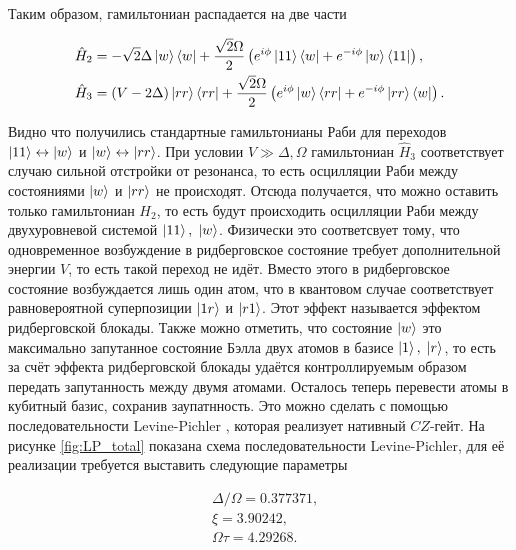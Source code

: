 Таким образом, гамильтониан распадается на две части

\begin{equation}
	\begin{aligned}
		& \hat{H}_{2} = -\sqrt{2}\Delta \left| w \right\rangle\left\langle w \right| + \frac{\sqrt{2}\Omega}{2}\left(e^{i\phi}\left| 11 \right\rangle\left\langle w \right| +e^{-i\phi}\left| w \right\rangle\left\langle 11 \right| \right), \\
		& \hat{H}_{3} = (V-2\Delta)\left| rr \right\rangle\left\langle rr \right| + \frac{\sqrt{2}\Omega}{2}\left(e^{i\phi}\left| w \right\rangle\left\langle rr \right| +e^{-i\phi}\left| rr \right\rangle\left\langle w \right| \right).
	\end{aligned}
\end{equation}

Видно что получились стандартные гамильтонианы Раби для переходов $\left| 11 \right\rangle \leftrightarrow \left| w \right\rangle$ и $\left| w \right\rangle \leftrightarrow \left| rr \right\rangle$. При условии $V \gg \Delta, \Omega$ гамильтониан $\hat{H}_3$ соответствует случаю сильной отстройки от резонанса, то есть осцилляции Раби между состояниями $\left| w \right\rangle$ и $\left| rr \right\rangle$ не происходят. Отсюда получается, что можно оставить только гамильтониан $H_2$, то есть будут происходить осцилляции Раби между двухуровневой системой $\left| 11 \right\rangle, \; \left| w \right\rangle$. Физически это соответсвует тому, что одновременное возбуждение в ридберговское состояние требует дополнительной энергии $V$, то есть такой переход не идёт. Вместо этого в ридберговское состояние возбуждается лишь один атом, что в квантовом случае соответствует равновероятной суперпозиции $\left| 1r \right\rangle$ и $\left| r1 \right\rangle$. Этот эффект называется эффектом ридберговской блокады. Также можно отметить, что состояние $\left| w \right\rangle$ это максимально запутанное состояние Бэлла двух атомов в базисе $\left| 1 \right\rangle, \; \left| r \right\rangle$, то есть за счёт эффекта ридберговской блокады удаётся контроллируемым образом передать запутанность между двумя атомами. Осталось теперь перевести атомы в кубитный базис, сохранив заупатнность. Это можно сделать с помощью последовательности Levine-Pichler \cite{toffoli}, которая реализует нативный $CZ$-гейт. На рисунке \ref{fig:LP_total} показана схема последовательности Levine-Pichler, для её реализации требуется выставить следующие параметры \cite{toffoli}

\begin{equation}
	\begin{aligned}
		& \Delta/\Omega = 0.377371, \\
		& \xi = 3.90242, \\
		& \Omega \tau = 4.29268.
	\end{aligned}
\end{equation}

